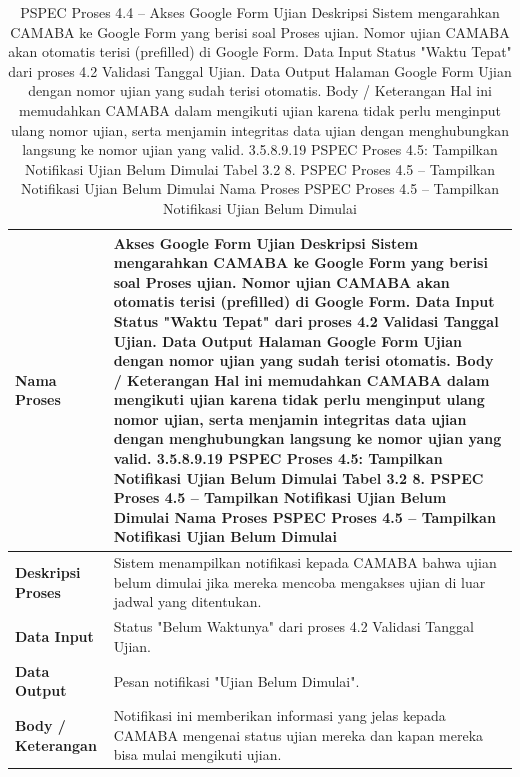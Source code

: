 \begin{longtable}{|p{}|p{}|}
	\caption{PSPEC Proses 4.4 -- Akses Google Form Ujian Deskripsi Sistem mengarahkan CAMABA ke Google Form yang berisi soal Proses ujian. Nomor ujian CAMABA akan otomatis terisi (prefilled) di Google Form. Data Input Status "Waktu Tepat" dari proses 4.2 Validasi Tanggal Ujian. Data Output Halaman Google Form Ujian dengan nomor ujian yang sudah terisi otomatis. Body / Keterangan Hal ini memudahkan CAMABA dalam mengikuti ujian karena tidak perlu menginput ulang nomor ujian, serta menjamin integritas data ujian dengan menghubungkan langsung ke nomor ujian yang valid. 3.5.8.9.19 PSPEC Proses 4.5: Tampilkan Notifikasi Ujian Belum Dimulai Tabel 3.2 8. PSPEC Proses 4.5 – Tampilkan Notifikasi Ujian Belum Dimulai Nama Proses PSPEC Proses 4.5 – Tampilkan Notifikasi Ujian Belum Dimulai}
	\label{table:3.pspec44}\\
	\hline
	\textbf{Nama Proses} & Akses Google Form Ujian Deskripsi Sistem mengarahkan CAMABA ke Google Form yang berisi soal Proses ujian. Nomor ujian CAMABA akan otomatis terisi (prefilled) di Google Form. Data Input Status "Waktu Tepat" dari proses 4.2 Validasi Tanggal Ujian. Data Output Halaman Google Form Ujian dengan nomor ujian yang sudah terisi otomatis. Body / Keterangan Hal ini memudahkan CAMABA dalam mengikuti ujian karena tidak perlu menginput ulang nomor ujian, serta menjamin integritas data ujian dengan menghubungkan langsung ke nomor ujian yang valid. 3.5.8.9.19 PSPEC Proses 4.5: Tampilkan Notifikasi Ujian Belum Dimulai Tabel 3.2 8. PSPEC Proses 4.5 – Tampilkan Notifikasi Ujian Belum Dimulai Nama Proses PSPEC Proses 4.5 – Tampilkan Notifikasi Ujian Belum Dimulai \\
	\hline
	\textbf{Deskripsi Proses} & Sistem menampilkan notifikasi kepada CAMABA bahwa ujian belum dimulai jika mereka mencoba mengakses ujian di luar jadwal yang ditentukan. \\
	\hline
	\textbf{Data Input} & Status "Belum Waktunya" dari proses 4.2 Validasi Tanggal Ujian. \\
	\hline
	\textbf{Data Output} & Pesan notifikasi "Ujian Belum Dimulai". \\
	\hline
	\textbf{Body / Keterangan} & Notifikasi ini memberikan informasi yang jelas kepada CAMABA mengenai status ujian mereka dan kapan mereka bisa mulai mengikuti ujian. \\
	\hline
\end{longtable}


